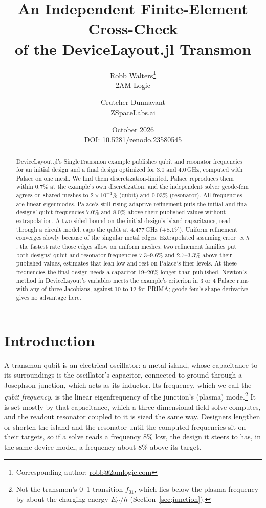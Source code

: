 \documentclass{anvil-paper}
\title{An Independent Finite-Element Cross-Check\\of the DeviceLayout.jl Transmon}
\author{Robb Walters\thanks{Corresponding author: \href{mailto:robb@2amlogic.com}{robb@2amlogic.com}}\\
  {\normalsize 2AM Logic}
  \and Crutcher Dunnavant\\
  {\normalsize ZSpaceLabs.ai}}
\date{October 2026\\[0.5ex]
  {\normalsize DOI: \href{https://doi.org/10.5281/zenodo.23580545}{10.5281/zenodo.23580545}}}
\begin{document}
\maketitle

\begin{abstract}
DeviceLayout.jl's SingleTransmon example publishes qubit and resonator
frequencies for an initial design and a final design optimized for $3.0$
and $4.0$\,GHz, computed with Palace on one mesh. We find them
discretization-limited. Palace reproduces them within $0.7\%$ at the
example's own discretization, and the independent solver geode-fem agrees
on shared meshes to $2\times10^{-4}\%$ (qubit) and $0.03\%$
(resonator). All frequencies are linear eigenmodes. Palace's
still-rising adaptive refinement puts the initial and final designs' qubit
frequencies $7.0\%$ and $8.0\%$ above their published values without
extrapolation. A two-sided bound on the initial design's island
capacitance, read through a circuit model, caps the qubit at
$4.477$\,GHz ($+8.1\%$). Uniform refinement converges slowly because of
the singular metal edges. Extrapolated assuming error $\propto h$, the
fastest rate those edges allow on uniform meshes, two refinement families put both
designs' qubit and resonator frequencies $7.3$--$9.6\%$ and
$2.7$--$3.3\%$ above their published values, estimates that lean low and
rest on Palace's finer levels. At these frequencies the final design needs
a capacitor $19$--$20\%$ longer than published. Newton's method in
DeviceLayout's variables meets the example's criterion in 3 or 4 Palace
runs with any of three Jacobians, against 10 to 12 for PRIMA; geode-fem's
shape derivative gives no advantage here.
\end{abstract}

\section{Introduction}
\label{sec:intro}

A transmon qubit is an electrical oscillator: a metal island, whose
capacitance to its surroundings is the oscillator's capacitor, connected
to ground through a Josephson junction, which acts as its inductor. Its
frequency, which we call the \emph{qubit frequency}, is the linear
eigenfrequency of the junction's (plasma) mode.\footnote{Not the
transmon's 0--1 transition $f_{01}$, which lies below the plasma frequency
by about the charging energy $E_C/h$ (Section~\ref{sec:junction}).} It is
set mostly by that capacitance, which a three-dimensional field solve
computes, and the readout resonator coupled to it is sized the same way. Designers lengthen or shorten the island and the resonator until
the computed frequencies sit on their targets, so if a solve reads a
frequency $8\%$ low, the design it steers to has, in the same device
model, a frequency about $8\%$ above its target.
\end{document}

